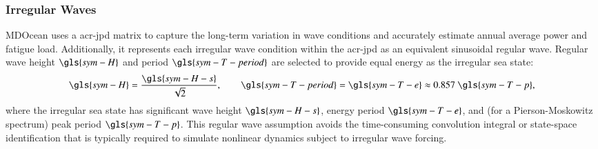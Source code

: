 


\subsubsection{Irregular Waves}\label{sec:irregular-waves}
MDOcean uses a \gls{acr-jpd} matrix to capture the long-term variation in wave conditions and accurately estimate annual average power and fatigue load.
Additionally, it represents each irregular wave condition within the \gls{acr-jpd} as an equivalent sinusoidal regular wave.
Regular wave height $\gls{sym-H}$ and period $\gls{sym-T-period}$ are selected to provide equal energy as the irregular sea state:
\begin{equation}\label{eq:regular-wave-equiv}
    \gls{sym-H} = \frac{\gls{sym-H-s}}{\sqrt{2}},
    \qquad
    \gls{sym-T-period} = \gls{sym-T-e} \approx 0.857 ~\gls{sym-T-p},
\end{equation}
where the irregular sea state has significant wave height $\gls{sym-H-s}$, energy period $\gls{sym-T-e}$, and (for a Pierson-Moskowitz spectrum) peak period $\gls{sym-T-p}$.
This regular wave assumption avoids the time-consuming convolution integral or state-space identification that is typically required to simulate nonlinear dynamics subject to irregular wave forcing.

